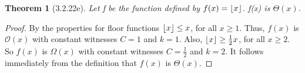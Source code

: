 \documentclass[a4paper, 12pt]{article}
\theoremstyle{plain}
\newtheorem*{theorem*}{Theorem}
\DeclarePairedDelimiter{\floor}{\lfloor}{\rfloor}
\begin{document}
	
	\begin{theorem*}[3.2.22e]
		Let f be the function defined by $f(x) = \floor{x}$. \newline f(x) is $\Theta(x)$.
	\end{theorem*}
	
	\begin{proof}
		By the properties for floor functions $\floor{x} \le x$, for all $x \ge 1$. Thus, $f(x)$ is $\mathcal{O}(x)$ with constant witnesses $C = 1$ and $k = 1$. Also, $\floor{x} \ge \frac{1}{2}x$, for all $x \ge 2$. So $f(x)$ is $\Omega(x)$ with constant witnesses $C = \frac{1}{2}$ and $k = 2$. It follows immediately from the definition that $f(x)$ is $\Theta(x)$.
	\end{proof}
\end{document}
